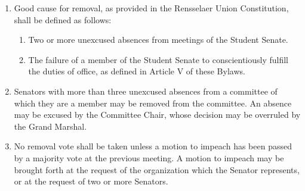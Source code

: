 
\begin{enumerate}

\item Good cause for removal, as provided in the Rensselaer Union Constitution, shall be defined as follows:
\begin{enumerate}
\item Two or more unexcused absences from meetings of the Student Senate.
\item The failure of a member of the Student Senate to conscientiously fulfill the duties of office, as defined in Article V of these
Bylaws.
\end{enumerate}

\item Senators with more than three unexcused absences from a committee of which they are a member may be removed from the
committee. An absence may be excused by the Committee Chair, whose decision may be overruled by the Grand Marshal.

\item No removal vote shall be taken unless a motion to impeach has been passed by a majority vote at the previous meeting. A motion to impeach may be brought forth at the request of the organization which the Senator represents, or at the request of two or more Senators.

\end{enumerate}
